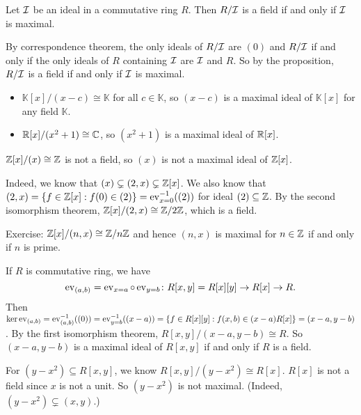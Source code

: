 \documentclass[12pt,letterpaper]{report}
\begin{document}
\begin{thm}{}{}
  Let $\mathcal{I}$ be an ideal in a commutative ring $R$.
  Then $R/\mathcal{I}$ is a field if and only if $\mathcal{I}$ is maximal.
\end{thm}

\begin{thmproof}
  By correspondence theorem, the only ideals of $R/\mathcal{I}$ are $(0)$ and $R/\mathcal{I}$ if and only if
  the only ideals of $R$ containing $\mathcal{I}$ are $\mathcal{I}$ and $R$.
  So by the proposition, $R/\mathcal{I}$ is a field if and only if $\mathcal{I}$ is maximal.
\end{thmproof}

\begin{ex}
  \begin{itemize}
    \item $\mathbb{K}[x]/(x - c) \cong \mathbb{K}$ for all $c \in \mathbb{K}$, so $(x - c)$ is a
      maximal ideal of $\mathbb{K}[x]$ for any field $\mathbb{K}$.
    \item $\mathbb{R}[x]/(x^2 + 1) \cong \mathbb{C}$, so $(x^2 + 1)$ is a maximal ideal of $\mathbb{R}[x]$.
  \end{itemize}
\end{ex}

\begin{ex}
  $\mathbb{Z}[x]/(x) \cong \mathbb{Z}$ is not a field, so $(x)$ is not a maximal ideal of $\mathbb{Z}[x]$.

  Indeed, we know that $(x) \subsetneq (2, x) \subsetneq \mathbb{Z}[x]$.
  We also know that $(2, x) = \{f \in \mathbb{Z}[x] : f(0) \in (2)\} = \operatorname{ev}_{x = 0}^{-1}((2))$ for ideal
  $(2) \subseteq \mathbb{Z}$.
  By the second isomorphism theorem, $\mathbb{Z}[x]/(2, x) \cong \mathbb{Z}/{2}\mathbb{Z}$, which is a field.

  Exercise: $\mathbb{Z}[x]/(n, x) \cong \mathbb{Z}/{n}\mathbb{Z}$ and hence $(n, x)$ is maximal for $n \in \mathbb{Z}$ if and only
  if $n$ is prime.
\end{ex}

\begin{ex}
  If $R$ is commutative ring, we have
  \[
    \operatorname{ev}_{(a, b)} = \operatorname{ev}_{x = a} \circ \operatorname{ev}_{y = b} \colon R[x, y] = R[x][y] \to R[x] \to R.
  \]
  Then $\ker\operatorname{ev}_{(a, b)} = \operatorname{ev}_{(a, b)}^{-1}((0)) = \operatorname{ev}_{y = b}^{-1}((x - a))
    = \{f \in R[x][y] : f(x, b) \in (x - a)R[x]\} = (x - a, y - b)$.
  By the first isomorphism theorem, $R[x, y]/(x - a, y - b) \cong R$.
  So $(x - a, y - b)$ is a maximal ideal of $R[x, y]$ if and only if $R$ is a field.

  For $(y - x^2) \subseteq R[x, y]$, we know $R[x, y]/(y - x^2) \cong R[x]$.
  $R[x]$ is not a field since $x$ is not a unit.
  So $(y - x^2)$ is not maximal.
  (Indeed, $(y - x^2) \subsetneq (x, y)$.)
\end{ex}
\end{document}
